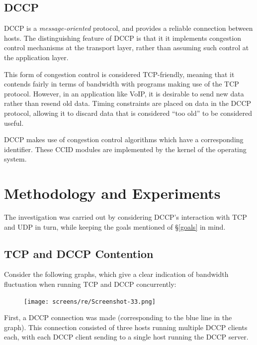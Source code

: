 \documentclass[10pt,a4paper]{article}
\begin{document}
\subsection{DCCP}
DCCP is a \emph{message-oriented} protocol, and provides a reliable connection between hosts. 
The distinguishing feature of DCCP is that it it implements congestion control mechanisms at the transport layer,
 rather than assuming such control at the application layer.

This form of congestion control is considered TCP-friendly, meaning that it contends fairly in terms of bandwidth with programs making
use of the TCP protocol. However, in an application like VoIP, it is desirable to send new data rather than resend old data. Timing
constraints are placed on data in the DCCP protocol, allowing it to discard data that is considered ``too old'' to be considered
useful. 

DCCP makes use of congestion control algorithms which have a corresponding identifier. These CCID modules are implemented by
the kernel of the operating system. 


\section{Methodology and Experiments}
The investigation was carried out by considering DCCP's interaction with TCP and
UDP in turn, while keeping the goals mentioned of
\S\ref{goals} in mind.

\subsection{TCP and DCCP Contention}
\label{tcpdccp}

Consider the following graphs, which give a clear indication of bandwidth fluctuation when running TCP and DCCP 
concurrently:

\newpage

\begin{figure}[!h]
\begin{center}
\hspace*{-65pt}
\texttt{[image: screens/re/Screenshot-33.png]}
\end{center}
\end{figure}

First, a DCCP connection was made (corresponding to the blue line in the graph).
This connection consisted of three hosts running multiple
DCCP clients each, with each DCCP client sending to a single host running the
DCCP server.
\end{document}
